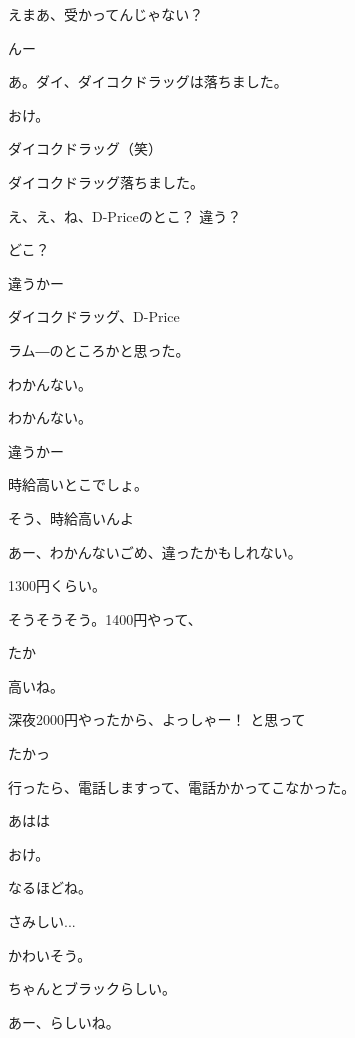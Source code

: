 \begin{multicols}{3}
{        えまあ、受かってんじゃない？

        んー

        あ。ダイ、ダイコクドラッグは落ちました。

        おけ。

        ダイコクドラッグ（笑）

        ダイコクドラッグ落ちました。

        え、え、ね、D-Priceのとこ？ 違う？

        どこ？

        違うかー

        ダイコクドラッグ、D-Price

        ラム―のところかと思った。

        わかんない。

        わかんない。

        違うかー

        時給高いとこでしょ。

        そう、時給高いんよ

        あー、わかんないごめ、違ったかもしれない。

        1300円くらい。

        そうそうそう。1400円やって、

        たか

        高いね。

        深夜2000円やったから、よっしゃー！ と思って

        たかっ

        行ったら、電話しますって、電話かかってこなかった。

        あはは

        おけ。

        なるほどね。

        さみしい...

        かわいそう。

        ちゃんとブラックらしい。

        あー、らしいね。

}
\end{multicols}
